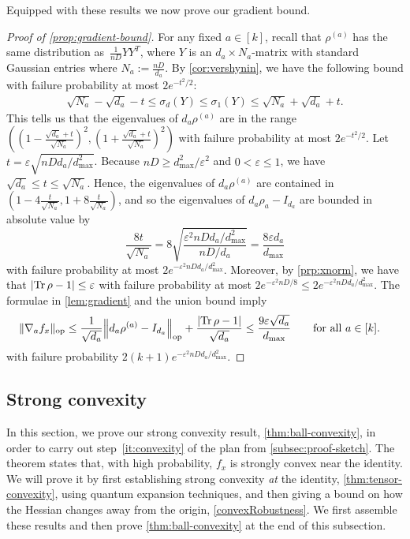 \documentclass[aos]{imsart}
\theoremstyle{definition}
\numberwithin{equation}{section}
\DeclareMathOperator{\op}{op}
\DeclareMathOperator{\tr}{Tr}
\DeclarePairedDelimiter{\abs}{\lvert}{\rvert}
\DeclarePairedDelimiter{\norm}{\lVert}{\rVert}
\newcommand{\eps}{\varepsilon}
\def\dmax{d_{\max}}
\begin{document}
Equipped with these results we now prove our gradient bound.

\begin{proof}[Proof of \cref{prop:gradient-bound}]
For any fixed $a\in[k]$, recall that $\rho^{(a)}$ has the same distribution as~$\frac1{nD} YY^T$, where $Y$ is an $d_a\times N_a$-matrix with standard Gaussian entries where $N_{a} := \frac{nD}{d_{a}}$.
By \cref{cor:vershynin}, we have the following bound with failure probability at most $ 2 e^{-t^2/2}$:
\begin{align*}
  \sqrt{N_a} - \sqrt{d_a} - t \leq \sigma_d(Y) \leq \sigma_1(Y) \leq \sqrt{N_a} + \sqrt{d_a} + t.
\end{align*}
This tells us that the eigenvalues of $d_a \rho^{(a)}$ are in the range $( (1 - \frac{\sqrt{d_a} + t}{\sqrt{N_a}})^2, (1 + \frac{\sqrt{d_a} + t}{\sqrt{N_a}})^2)$ with failure probability at most $2 e^{-t^2/2}$. Let $t = \eps \sqrt{n D d_{a}/ \dmax^{2}}$.
Because $nD \geq \dmax^{2}/\eps^{2}$ and $0 < \eps \leq 1$, we have $\sqrt{d_{a}} \leq t \leq \sqrt{N_a}$.
Hence, the eigenvalues of $d_a \rho^{(a)}$ are contained in $( 1 - 4\frac{t}{\sqrt{N_a}}, 1 + 8 \frac{ t}{\sqrt{N_a}})$, and so the eigenvalues of $d_{a} \rho_{a} - I_{d_{a}}$ are bounded in absolute value by
\[ \frac{8t}{\sqrt{N_{a}}} = 8 \sqrt{ \frac{\eps^{2} nD d_{a}/ \dmax^{2}}{nD / d_{a}} }
=  \frac{8\eps d_{a}}{\dmax}  \]
with failure probability at most $2e^{-\eps^{2} n D d_{a}/ \dmax^{2}}$.
Moreover, by \cref{prp:xnorm}, we have that $\abs{\tr \rho - 1} \leq \eps$ with failure probability at most $ 2e^{-\eps^2 nD/8} \leq 2e^{-\eps^{2} n D d_{a}/ \dmax^{2}}$.
The formulae in \cref{lem:gradient} and the union bound imply
\begin{align*}
  \norm{\nabla_a f_x}_{\op}
&\leq\frac{1}{\sqrt{d_a}} \norm*{d_{a} \rho^{(a)} - I_{d_a}}_{\op} + \frac{\abs{\tr\rho - 1}}{\sqrt{d_a}}
\leq \frac{9\eps \sqrt{d_{a}} }{\dmax} \qquad \text{for all } a\in[k].
\end{align*}
with failure probability $2 (k+1) e^{-\eps^{2} n D d_{a}/ \dmax^{2}}$.
\end{proof}

\subsection{Strong convexity}\label{subsec:strong-convex}
In this section, we prove our strong convexity result, \cref{thm:ball-convexity}, in order to carry out step~\ref{it:convexity} of the plan from \cref{subsec:proof-sketch}.
The theorem states that, with high probability, $f_x$ is strongly convex near the identity.
We will prove it by first establishing strong convexity \emph{at} the identity, \cref{thm:tensor-convexity}, using quantum expansion techniques, and then giving a bound on how the Hessian changes away from the origin, \cref{convexRobustness}.
We first assemble these results and then prove \cref{thm:ball-convexity} at the end of this subsection.
\end{document}
